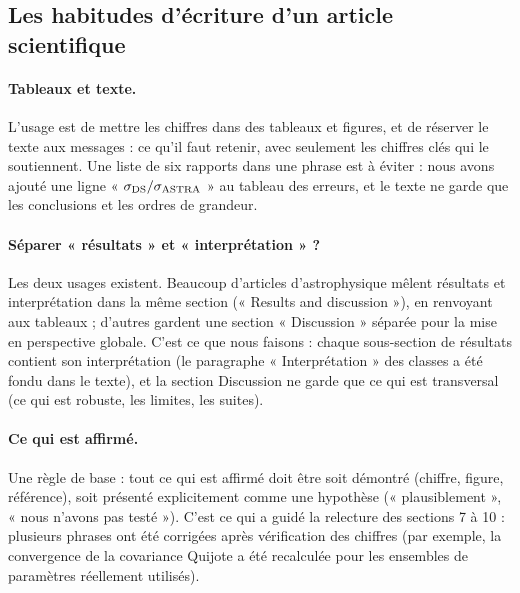 \subsection{Les habitudes d'écriture d'un article scientifique}
\paragraph{Tableaux et texte.} L'usage est de mettre les chiffres dans des tableaux et figures, et de réserver le texte aux messages : ce qu'il faut retenir, avec seulement les chiffres clés qui le soutiennent. Une liste de six rapports dans une phrase est à éviter : nous avons ajouté une ligne « $\sigma_{\rm DS}/\sigma_{\rm ASTRA}$ » au tableau des erreurs, et le texte ne garde que les conclusions et les ordres de grandeur.

\paragraph{Séparer « résultats » et « interprétation » ?} Les deux usages existent. Beaucoup d'articles d'astrophysique mêlent résultats et interprétation dans la même section (« Results and discussion »), en renvoyant aux tableaux ; d'autres gardent une section « Discussion » séparée pour la mise en perspective globale. C'est ce que nous faisons : chaque sous-section de résultats contient son interprétation (le paragraphe « Interprétation » des classes a été fondu dans le texte), et la section Discussion ne garde que ce qui est transversal (ce qui est robuste, les limites, les suites).

\paragraph{Ce qui est affirmé.} Une règle de base : tout ce qui est affirmé doit être soit démontré (chiffre, figure, référence), soit présenté explicitement comme une hypothèse (« plausiblement », « nous n'avons pas testé »). C'est ce qui a guidé la relecture des sections 7 à 10 : plusieurs phrases ont été corrigées après vérification des chiffres (par exemple, la convergence de la covariance Quijote a été recalculée pour les ensembles de paramètres réellement utilisés).
